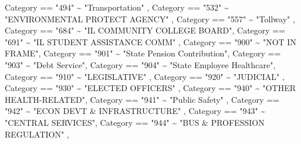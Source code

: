 \documentclass[
  letterpaper,
  DIV=11,
  numbers=noendperiod]{scrreport}
\newenvironment{Shaded}{\begin{snugshade}}{\end{snugshade}}
\newcommand{\NormalTok}[1]{\textcolor[rgb]{0.00,0.23,0.31}{#1}}
\newcommand{\SpecialCharTok}[1]{\textcolor[rgb]{0.37,0.37,0.37}{#1}}
\newcommand{\StringTok}[1]{\textcolor[rgb]{0.13,0.47,0.30}{#1}}
\begin{document}
\begin{Shaded}
\begin{Highlighting}[]
\NormalTok{             Category }\SpecialCharTok{==} \StringTok{"494"} \SpecialCharTok{\textasciitilde{}} \StringTok{"Transportation"}\NormalTok{ ,}
\NormalTok{             Category }\SpecialCharTok{==} \StringTok{"532"} \SpecialCharTok{\textasciitilde{}} \StringTok{"ENVIRONMENTAL PROTECT AGENCY"}\NormalTok{ ,}
\NormalTok{             Category }\SpecialCharTok{==} \StringTok{"557"} \SpecialCharTok{\textasciitilde{}} \StringTok{"Tollway"}\NormalTok{ ,}
\NormalTok{             Category }\SpecialCharTok{==} \StringTok{"684"} \SpecialCharTok{\textasciitilde{}} \StringTok{"IL COMMUNITY COLLEGE BOARD"}\NormalTok{, }
\NormalTok{             Category }\SpecialCharTok{==} \StringTok{"691"} \SpecialCharTok{\textasciitilde{}} \StringTok{"IL STUDENT ASSISTANCE COMM"}\NormalTok{ ,}
\NormalTok{             Category }\SpecialCharTok{==} \StringTok{"900"} \SpecialCharTok{\textasciitilde{}} \StringTok{"NOT IN FRAME"}\NormalTok{,}
\NormalTok{             Category }\SpecialCharTok{==} \StringTok{"901"} \SpecialCharTok{\textasciitilde{}} \StringTok{"State Pension Contribution"}\NormalTok{,}
\NormalTok{             Category }\SpecialCharTok{==} \StringTok{"903"} \SpecialCharTok{\textasciitilde{}} \StringTok{"Debt Service"}\NormalTok{,}
\NormalTok{             Category }\SpecialCharTok{==} \StringTok{"904"} \SpecialCharTok{\textasciitilde{}} \StringTok{"State Employee Healthcare"}\NormalTok{,}
\NormalTok{             Category }\SpecialCharTok{==} \StringTok{"910"} \SpecialCharTok{\textasciitilde{}} \StringTok{"LEGISLATIVE"}\NormalTok{  ,}
\NormalTok{             Category }\SpecialCharTok{==} \StringTok{"920"} \SpecialCharTok{\textasciitilde{}} \StringTok{"JUDICIAL"}\NormalTok{ ,}
\NormalTok{             Category }\SpecialCharTok{==} \StringTok{"930"} \SpecialCharTok{\textasciitilde{}} \StringTok{"ELECTED OFFICERS"}\NormalTok{ , }
\NormalTok{             Category }\SpecialCharTok{==} \StringTok{"940"} \SpecialCharTok{\textasciitilde{}} \StringTok{"OTHER HEALTH{-}RELATED"}\NormalTok{, }
\NormalTok{             Category }\SpecialCharTok{==} \StringTok{"941"} \SpecialCharTok{\textasciitilde{}} \StringTok{"Public Safety"}\NormalTok{ ,}
\NormalTok{             Category }\SpecialCharTok{==} \StringTok{"942"} \SpecialCharTok{\textasciitilde{}} \StringTok{"ECON DEVT \& INFRASTRUCTURE"}\NormalTok{ ,}
\NormalTok{             Category }\SpecialCharTok{==} \StringTok{"943"} \SpecialCharTok{\textasciitilde{}} \StringTok{"CENTRAL SERVICES"}\NormalTok{,}
\NormalTok{             Category }\SpecialCharTok{==} \StringTok{"944"} \SpecialCharTok{\textasciitilde{}} \StringTok{"BUS \& PROFESSION REGULATION"}\NormalTok{ ,}

\end{Highlighting}
\end{Shaded}
\end{document}
